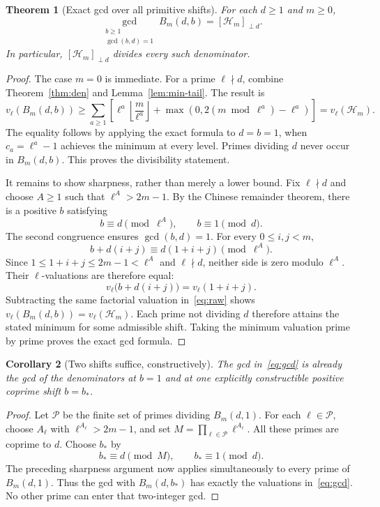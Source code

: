 \documentclass[11pt,a4paper]{article}
\newtheorem{theorem}{Theorem}[section]
\newtheorem{corollary}[theorem]{Corollary}
\theoremstyle{definition}
\theoremstyle{remark}
\newcommand{\HH}{\mathcal H}
\newcommand{\floor}[1]{\left\lfloor #1\right\rfloor}
\newcommand{\freepart}[2]{\left[#1\right]_{\perp #2}}
\begin{document}
\begin{theorem}[Exact gcd over all primitive shifts]
\label{thm:gcd}
For each $d\ge1$ and $m\ge0$,
\begin{equation}
 \boxed{\gcd_{\substack{b\ge1\\\gcd(b,d)=1}} B_m(d,b)
       =\freepart{\HH_m}{d}.}
 \label{eq:gcd}
\end{equation}
In particular, $\freepart{\HH_m}{d}$ divides every such denominator.
\end{theorem}
\begin{proof}
The case $m=0$ is immediate. For a prime $\ell\nmid d$, combine
Theorem~\ref{thm:den} and Lemma~\ref{lem:min-tail}. The result is
\begin{equation}
 v_\ell(B_m(d,b))\ge
 \sum_{a\ge1}\left[
 \ell^a\floor{\frac m{\ell^a}}+
 \max(0,2(m\bmod\ell^a)-\ell^a)\right]
 =v_\ell(\HH_m).
 \label{eq:universal-bound}
\end{equation}
The equality follows by applying the exact formula to $d=b=1$, when
$c_a=\ell^a-1$ achieves the minimum at every level. Primes dividing $d$
never occur in $B_m(d,b)$. This proves the divisibility statement.

It remains to show sharpness, rather than merely a lower bound. Fix
$\ell\nmid d$ and choose $A\ge1$ such that $\ell^A>2m-1$.
By the Chinese remainder theorem, there is a positive $b$ satisfying
\[
 b\equiv d\pmod{\ell^A},\qquad b\equiv1\pmod d.
\]
The second congruence ensures $\gcd(b,d)=1$. For every $0\le i,j<m$,
\[
 b+d(i+j)\equiv d(1+i+j)\pmod{\ell^A}.
\]
Since $1\le1+i+j\le2m-1<\ell^A$ and $\ell\nmid d$, neither side is
zero modulo $\ell^A$. Their $\ell$-valuations are therefore equal:
\[
 v_\ell\bigl(b+d(i+j)\bigr)=v_\ell(1+i+j).
\]
Subtracting the same factorial valuation in~\eqref{eq:raw} shows
$v_\ell(B_m(d,b))=v_\ell(\HH_m)$. Each prime not dividing $d$ therefore
attains the stated minimum for some admissible shift. Taking the minimum
valuation prime by prime proves the exact gcd formula.
\end{proof}

\begin{corollary}[Two shifts suffice, constructively]
\label{cor:two}
The gcd in~\eqref{eq:gcd} is already the gcd of the denominators at $b=1$
and at one explicitly constructible positive coprime shift $b=b_*$.
\end{corollary}
\begin{proof}
Let $\mathcal P$ be the finite set of primes dividing $B_m(d,1)$.
For each $\ell\in\mathcal P$, choose $A_\ell$ with
$\ell^{A_\ell}>2m-1$, and set
$M=\prod_{\ell\in\mathcal P}\ell^{A_\ell}$.
All these primes are coprime to $d$. Choose $b_*$ by
\[
 b_*\equiv d\pmod M,\qquad b_*\equiv1\pmod d.
\]
The preceding sharpness argument now applies simultaneously to every prime
of $B_m(d,1)$. Thus the gcd with $B_m(d,b_*)$ has exactly the valuations
in~\eqref{eq:gcd}. No other prime can enter that two-integer gcd.
\end{proof}
\end{document}
